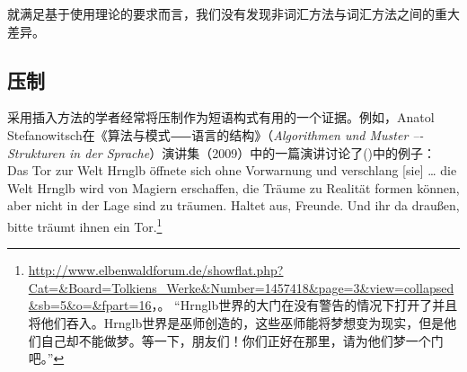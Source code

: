     就满足基于使用理论的要求而言，我们没有发现非词汇方法与词汇方法之间的重大差异。

\subsection{压制}
\label{coercion-sec}
    采用插入方法的学者经常将压制作为短语构式有用的一个证据。例如，Anatol Stefanowitsch在《算法与模式⸺语言的结构》（\emph{Algorithmen und Muster –-
  Strukturen in der Sprache}）演讲集（2009）中的一篇演讲讨论了()中的例子：\ea
Das Tor zur Welt Hrnglb öffnete sich ohne Vorwarnung
und verschlang [sie] \ldots{} die Welt Hrnglb wird von Magiern
erschaffen, die Träume zu Realität formen können, aber
nicht in der Lage sind zu träumen. Haltet aus, Freunde.
Und ihr da draußen, bitte träumt ihnen ein Tor.\footnote{%
\url{http://www.elbenwaldforum.de/showflat.php?Cat=&Board=Tolkiens_Werke&Number=1457418&page=3&view=collapsed&sb=5&o=&fpart=16}，。
“Hrnglb世界的大门在没有警告的情况下打开了并且将他们吞入。Hrnglb世界是巫师创造的，这些巫师能将梦想变为现实，但是他们自己却不能做梦。等一下，朋友们！你们正好在那里，请为他们梦一个门吧。”
}
\z

